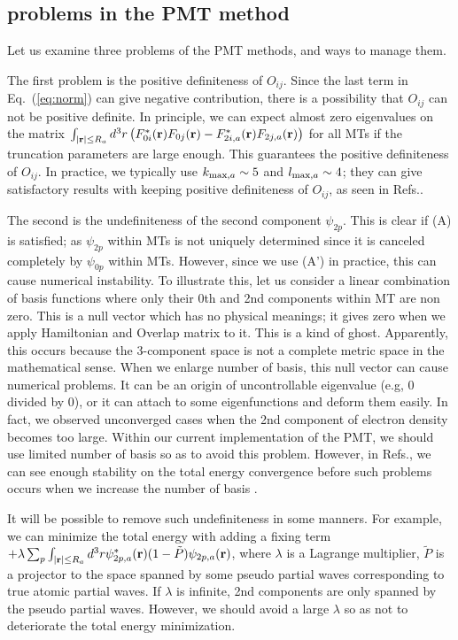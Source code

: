 \documentclass[a4paper,10pt,aip,onecolumn,amsmath,amssymb,floatfix,rmp]{revtex4-1}
\newcommand{\bfr}{{\bf r}}
\newcommand{\req}[1]{\mbox{Eq.~\!(\ref{#1})}}
\def\intaa{\int_{|\bfr|\leq R_a}}
\begin{document}
\subsection{problems in the PMT method}
\label{sec:problems}
Let us examine three problems of the PMT methods, and ways to
manage them.

The first problem is the positive definiteness of $O_{ij}$.
Since the last term in \req{eq:norm} can give negative contribution,
there is a possibility that $O_{ij}$ can not be positive definite.
In principle, we can expect almost zero eigenvalues on the matrix
$\intaa d^3r \left(F^*_{0i}(\bfr)F_{0j}(\bfr)-F^*_{2i,a}(\bfr)F_{2j,a}(\bfr)\right)$ 
for all MTs if the truncation parameters are large enough. 
This guarantees the positive definiteness of $O_{ij}$.
In practice, we typically use $k_{{\rm max},a} \sim 5$ 
and $l_{{\rm max},a}\sim 4$; they
can give satisfactory results with keeping positive
definiteness of $O_{ij}$, as seen in Refs.\cite{pmt1,kotanimol2011}.

The second is the undefiniteness of the second component $\psi_{2p}$.
This is clear if (A) is satisfied; as $\psi_{2p}$ within MTs is not uniquely
determined since it is canceled completely by $\psi_{0p}$ within MTs.
However, since we use (A') in practice, this can cause numerical instability.
To illustrate this, let us consider a linear combination of basis functions
where only their 0th and 2nd components within MT are non zero.
This is a null vector which has no physical meanings; it gives zero when 
we apply Hamiltonian and Overlap matrix to it. This is a kind of ghost. 
Apparently, this occurs because the 3-component space is not a complete
metric space in the mathematical sense.
When we enlarge number of basis, this null vector can cause numerical problems.
It can be an origin of uncontrollable eigenvalue (e.g, 0 divided by 0), or
it can attach to some eigenfunctions and deform them easily.
In fact, we observed unconverged cases when the 2nd component of
electron density becomes too large. 
Within our current implementation of the PMT, we should use limited number
of basis so as to avoid this problem. However, in Refs.\cite{pmt1,kotanimol2011},
we can see enough stability on the total energy convergence before such problems occurs
when we increase the number of basis .

It will be possible to remove such undefiniteness in some manners.
For example, we can minimize the total energy with adding a 
fixing term $+\lambda \sum_p \intaa d^3r
\psi^*_{2p,a}(\bfr)(1-\tilde{P})\psi_{2p,a}(\bfr)$, 
where $\lambda$ is a Lagrange multiplier, $\tilde{P}$ is a projector to
the space spanned by some pseudo partial waves corresponding to true
atomic partial waves. If $\lambda$ is infinite,
2nd components are only spanned by the pseudo partial waves.
However, we should avoid a large $\lambda$ so as not to 
deteriorate the total energy minimization.
\end{document}
